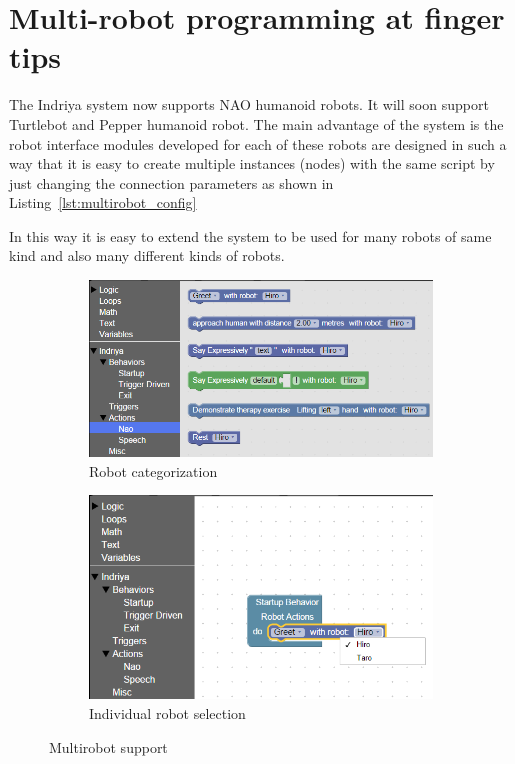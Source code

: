 \section{Multi-robot programming at finger tips}
The Indriya system now supports NAO humanoid robots. It will soon support Turtlebot and Pepper humanoid robot. The main advantage of the system is the robot interface modules developed for each of these robots are designed in such a way that it is easy to create multiple instances (nodes) with the same script by just changing the connection parameters as shown in Listing~\ref{lst:multirobot_config}

In this way it is easy to extend the system to be used for many robots of same kind and also many different kinds of robots. 
\begin{figure}
\centering
\begin{subfigure}[t]{0.8\textwidth}
\includegraphics[width=\textwidth]{../thesis/assets/toolbox_multirobot.png}
\caption[Robot categorization]{Robot categorization}
\label{fig:robot_categorize}
\end{subfigure}

\begin{subfigure}[t]{0.8\textwidth}
\includegraphics[width=\textwidth]{../thesis/assets/toolbox_multirobot2.png}
\caption[Individual robot selection]{Individual robot selection}
\label{fig:robot_selection}
\end{subfigure}
\caption[Multirobot support]{Multirobot support}
\label{fig:multirobot_support}
\end{figure}
